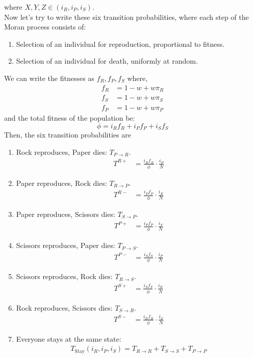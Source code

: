 \documentclass{article}
\begin{document}
where $X,Y,Z \in (i_R,i_P,i_S)$.\\
Now let's try to write these six transition probabilities,
where each step of the Moran process consists of:
\begin{enumerate}
\item Selection of an individual for reproduction, proportional to fitness.
\item Selection of an individual for death, uniformly at random.
\end{enumerate}
We can write the fitnesses as \( f_R, f_P, f_S \) where,
\begin{align}
f_R &= 1-w+w\pi_R \nonumber\\
f_S &= 1-w+w\pi_S \nonumber\\
f_P &= 1-w+w\pi_P \label{eq:42}
\end{align}
and the total fitness of the population be:
\begin{equation}
\phi = i_R f_R + i_P f_P + i_S f_S \label{eq:43}
\end{equation}
Then, the six transition probabilities are 
\begin{enumerate}
\item Rock reproduces, Paper dies: $T_{P \to R}$.
\begin{align}
T^{R+} &= \frac{i_R f_R}{\phi} \cdot \frac{i_P}{N} \label{eq:44}
\end{align}
\item Paper reproduces, Rock dies: $T_{R \to P}$.
\begin{align}
T^{R-} &= \frac{i_P f_P}{\phi} \cdot \frac{i_R}{N}\label{eq:45}
\end{align}
\item Paper reproduces, Scissors dies: $T_{S \to P}$.
\begin{align}
T^{P+} &= \frac{i_P f_P}{\phi} \cdot \frac{i_S}{N} \label{eq:46}
\end{align}
\item Scissors reproduces, Paper dies: $T_{P \to S}$.
\begin{align}
T^{P-} &= \frac{i_S f_S}{\phi} \cdot \frac{i_P}{N} \label{eq:47}
\end{align}
\item Scissors reproduces, Rock dies: $T_{R \to S}$.
\begin{align}
T^{S+} &= \frac{i_S f_S}{\phi} \cdot \frac{i_R}{N} \label{eq:48}
\end{align}
\item Rock reproduces, Scissors dies: $T_{S \to R}$.
\begin{align}
T^{S-} &= \frac{i_R f_R}{\phi} \cdot \frac{i_S}{N} \label{eq:49}
\end{align}
\item Everyone stays at the same state:
\begin{align}
T_{\text{Stay}}(i_R,i_P,i_S) = T_{R \to R} + T_{S \to S} + T_{P \to P} \label{eq:50}
\end{align}
\end{enumerate}
\end{document}
